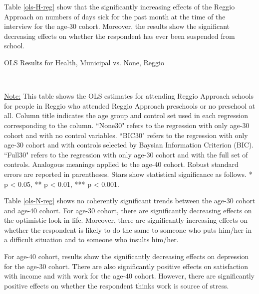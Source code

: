 Table \ref{ols-H-reg} show that the significantly increasing effects of the Reggio Approach on numbers of days sick for the past month at the time of the interview for the age-30 cohort. Moreover, the results show the significant decreasing effects on whether the respondent has ever been suspended from school. 

\begin{table}[H] \caption{OLS Results for Health, Municipal vs. None, Reggio} \label{ols-H-reg}

\vspace{1ex} \\
\footnotesize\raggedright{\underline{Note:} This table shows the OLS estimates for attending Reggio Approach schools for people in Reggio who attended Reggio Approach preschools or no preschool at all. Column title indicates the age group and control set used in each regression corresponding to the column. ``None30" refers to the regression with only age-30 cohort and with no control variables. ``BIC30" refers to the regression with only age-30 cohort and with controls selected by Baysian Information Criterion (BIC). ``Full30" refers to the regression with only age-30 cohort and with the full set of controls. Analogous meanings applied to the age-40 cohort. Robust standard errors are reported in parentheses. Stars show statistical significance as follows. * p < 0.05, ** p < 0.01, *** p < 0.001.}
\end{table}

Table \ref{ols-N-reg} shows no coherently significant trends between the age-30 cohort and age-40 cohort. For age-30 cohort, there are significantly decreasing effects on the optimistic look in life. Moreover, there are significantly increasing effects on whether the respondent is likely to do the same to someone who puts him/her in a difficult situation and to someone who insults him/her.

For age-40 cohort, results show the significantly decreasing effects on depression for the age-30 cohort. There are also significantly positive effects on satisfaction with income and with work for the age-40 cohort. However, there are significantly positive effects on whether the respondent thinks work is source of stress. 

